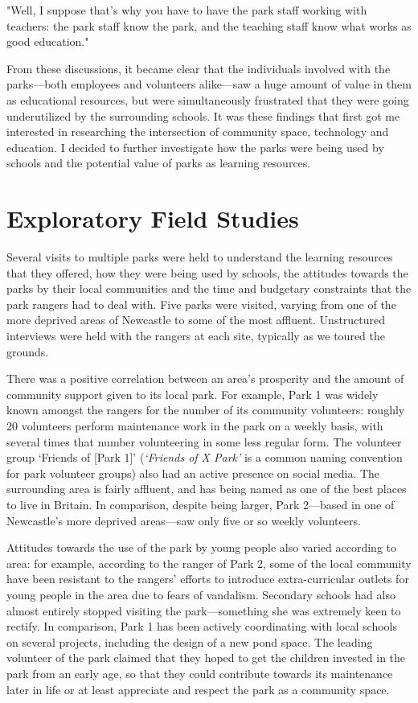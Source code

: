 \begin{displayquote}
"Well, I suppose that's why you have to have the park staff working with teachers: the park staff know the park, and the teaching staff know what works as good education."
\end{displayquote}

From these discussions, it became clear that the individuals involved with the parks---both employees and volunteers alike---saw a huge amount of value in them as educational resources, but were simultaneously frustrated that they were going underutilized by the surrounding schools. It was these findings that first got me interested in researching the intersection of community space, technology and education. I decided to further investigate how the parks were being used by schools and the potential value of parks as learning resources.

\section{Exploratory Field Studies}
Several visits to multiple parks were held to understand the learning resources that they offered, how they were being used by schools, the attitudes towards the parks by their local communities and the time and budgetary constraints that the park rangers had to deal with. Five parks were visited, varying from one of the more deprived areas of Newcastle to some of the most affluent. Unstructured interviews were held with the rangers at each site, typically as we toured the grounds.

There was a positive correlation between an area’s prosperity and the amount of community support given to its local park. For example, Park 1 was widely known amongst the rangers for the number of its community volunteers: roughly 20 volunteers perform maintenance work in the park on a weekly basis, with several times that number volunteering in some less regular form. The volunteer group `Friends of [Park 1]' (\textit{`Friends of X Park'} is a common naming convention for park volunteer groups) also had an active presence on social media. The surrounding area is fairly affluent, and has being named as one of the best places to live in Britain. In comparison, despite being larger, Park 2---based in one of Newcastle’s more deprived areas---saw only five or so weekly volunteers. 

Attitudes towards the use of the park by young people also varied according to area: for example, according to the ranger of Park 2, some of the local community have been resistant to the rangers' efforts to introduce extra-curricular outlets for young people in the area due to fears of vandalism. Secondary schools had also almost entirely stopped visiting the park---something she was extremely keen to rectify. In comparison, Park 1 has been actively coordinating with local schools on several projects, including the design of a new pond space. The leading volunteer of the park claimed that they hoped to get the children invested in the park from an early age, so that they could contribute towards its maintenance later in life or at least appreciate and respect the park as a community space. 

